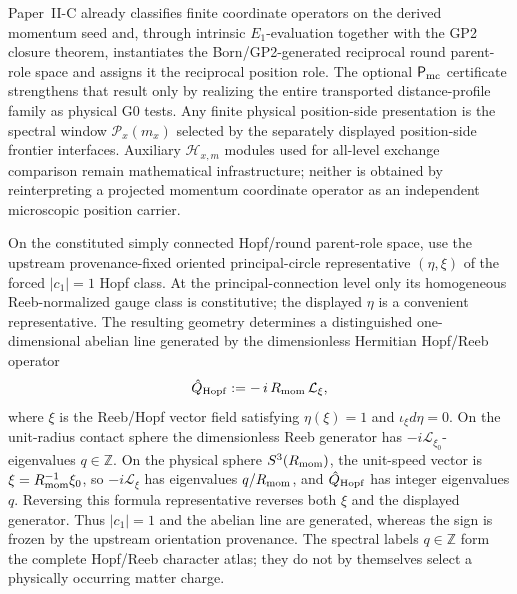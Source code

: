 \documentclass[12pt,a4paper]{article}
\begin{document}
\begin{remark}
\label{p3:rem:p2-to-p3-position}
Paper~II-C already classifies finite coordinate operators on the derived
momentum seed and, through intrinsic \(E_1\)-evaluation together with the GP2
closure theorem, instantiates the Born/GP2-generated reciprocal round parent-role
space and assigns it the reciprocal position role.  The optional
\(\mathsf P_{\rm mc}\) certificate strengthens that result only by realizing
the entire transported distance-profile family as physical G0 tests.  Any
finite physical position-side presentation is the spectral window
\(\mathcal P_x(m_x)\) selected by the separately displayed position-side
frontier interfaces.  Auxiliary \(\mathcal H_{x,m}\) modules used for
all-level exchange comparison remain mathematical infrastructure; neither is
obtained by reinterpreting a projected momentum coordinate operator as an
independent microscopic position carrier.
\end{remark}

\begin{corollary}
\label{p3:cor:hopf-abelian-line}
On the constituted simply connected Hopf/round parent-role space, use the
upstream provenance-fixed oriented principal-circle representative
\((\eta,\xi)\) of the forced \(\lvert c_1\rvert=1\) Hopf class.  At the
principal-connection level only its homogeneous Reeb-normalized gauge class is
constitutive; the displayed \(\eta\) is a convenient representative.  The
resulting geometry determines a distinguished one-dimensional abelian line
generated by the dimensionless
Hermitian Hopf/Reeb operator
\[
\hat Q_{\rm Hopf}:=-\,i\,R_{\mathrm{mom}}\,\mathcal L_\xi,
\]
where \(\xi\) is the Reeb/Hopf vector field satisfying \(\eta(\xi)=1\) and
\(\iota_\xi d\eta=0\).  On the unit-radius contact sphere the dimensionless
Reeb generator has \(-i\mathcal L_{\xi_0}\)-eigenvalues \(q\in\mathbb Z\).
On the physical sphere \(S^3(R_{\mathrm{mom}})\), the unit-speed vector is
\(\xi=R_{\mathrm{mom}}^{-1}\xi_0\), so \(-i\mathcal L_\xi\) has eigenvalues
\(q/R_{\mathrm{mom}}\), and \(\hat Q_{\rm Hopf}\) has integer eigenvalues \(q\).
Reversing this formula representative reverses both \(\xi\) and the displayed
generator.  Thus \(\lvert c_1\rvert=1\) and the abelian line are generated, whereas
the sign is frozen by the upstream orientation provenance.  The spectral
labels \(q\in\mathbb Z\) form the complete Hopf/Reeb character atlas; they
do not by themselves select a physically occurring matter charge.
\end{corollary}
\end{document}
